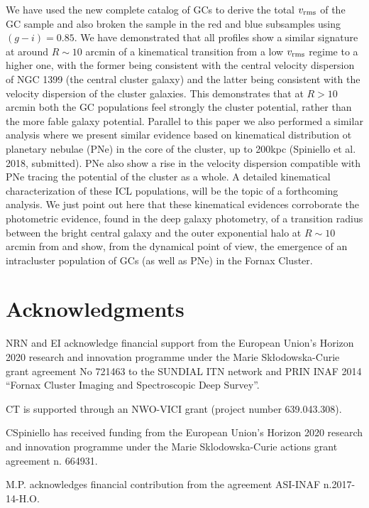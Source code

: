 \documentclass[useAMS,usenatbib]{mn2e}
\begin{document}
We have used the new complete catalog of GCs to derive the total  $v_{\rm rms}$ 
of the GC sample and also broken the sample in the red and blue subsamples using
$(g - i) = 0.85$.
We have demonstrated that all profiles show a similar signature at around 
$R\sim10$ arcmin of a kinematical transition from a low $v_{\rm rms}$ regime to a 
higher one, with the former being consistent with the central velocity 
dispersion of NGC 1399 (the central cluster galaxy) and the latter being 
consistent with the velocity dispersion of the cluster galaxies. This 
demonstrates that at $R>10$ arcmin both the GC populations feel strongly the cluster 
potential, rather than the more fable galaxy potential. Parallel to this paper 
we also performed a similar analysis where we present similar evidence based on 
kinematical distribution ot planetary nebulae (PNe) in the core of the cluster, 
up to 200kpc (Spiniello et al. 2018, submitted). PNe also show a rise in the 
velocity dispersion compatible with PNe tracing the potential of the cluster as 
a whole. A detailed kinematical characterization of these ICL populations, will 
be the topic of a forthcoming analysis. We just point out here that these 
kinematical evidences corroborate the photometric evidence, found in the deep 
galaxy photometry, of a transition radius between the bright central galaxy and 
the outer exponential halo at $R\sim10$ arcmin from \citet{Iodice16} and 
show, from the dynamical point of view, the emergence of an intracluster 
population of GCs (as well as PNe) in the Fornax Cluster.

\section{Acknowledgments}

NRN and EI acknowledge financial support from the European Union’s Horizon
2020 research and innovation programme under the Marie Sk\l{}odowska-Curie
grant agreement No 721463 to the SUNDIAL ITN network and  PRIN INAF 2014 
``Fornax Cluster Imaging and Spectroscopic Deep Survey''.

CT is supported through an NWO-VICI grant (project number 639.043.308).

CSpiniello has received funding from the European Union's Horizon 2020 
research and innovation programme under the Marie Sklodowska-Curie 
actions grant agreement n. 664931.

M.P. acknowledges financial contribution from the agreement ASI-INAF n.2017-14-H.O.
\end{document}
